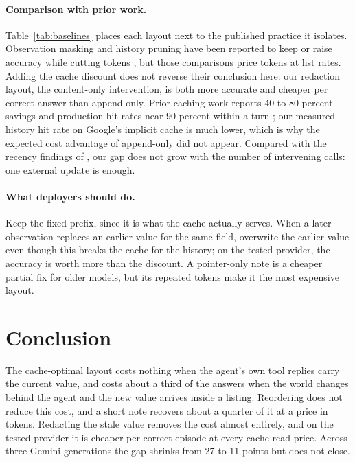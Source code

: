 \paragraph{Comparison with prior work.} Table~\ref{tab:baselines} places each layout next to the published practice it isolates. Observation masking and history pruning have been reported to keep or raise accuracy while cutting tokens \citep{a2508_21433,a2606_10209}, but those comparisons price tokens at list rates. Adding the cache discount does not reverse their conclusion here: our redaction layout, the content-only intervention, is both more accurate and cheaper per correct answer than append-only. Prior caching work reports 40 to 80 percent savings \citep{a2601_06007} and production hit rates near 90 percent within a turn \citep{a2608_00101}; our measured history hit rate on Google's implicit cache is much lower, which is why the expected cost advantage of append-only did not appear. Compared with the recency findings of \citet{a2603_12271}, our gap does not grow with the number of intervening calls: one external update is enough.

\paragraph{What deployers should do.} Keep the fixed prefix, since it is what the cache actually serves. When a later observation replaces an earlier value for the same field, overwrite the earlier value even though this breaks the cache for the history; on the tested provider, the accuracy is worth more than the discount. A pointer-only note is a cheaper partial fix for older models, but its repeated tokens make it the most expensive layout.

\section{Conclusion}
\label{sec:conclusion}
The cache-optimal layout costs nothing when the agent's own tool replies carry the current value, and costs about a third of the answers when the world changes behind the agent and the new value arrives inside a listing. Reordering does not reduce this cost, and a short note recovers about a quarter of it at a price in tokens. Redacting the stale value removes the cost almost entirely, and on the tested provider it is cheaper per correct episode at every cache-read price. Across three Gemini generations the gap shrinks from 27 to 11 points but does not close.

